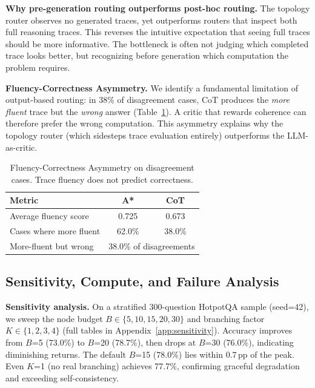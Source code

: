 \documentclass{article}
\begin{document}
\textbf{Why pre-generation routing outperforms post-hoc routing.}
The topology router observes no generated traces, yet outperforms routers that inspect both full reasoning traces. This reverses the intuitive expectation that seeing full traces should be more informative. The bottleneck is often not judging which completed trace looks better, but recognizing before generation which computation the problem requires.

\textbf{Fluency-Correctness Asymmetry.}
We identify a fundamental limitation of output-based routing: in 38\% of disagreement cases, CoT produces the \emph{more fluent} trace but the \emph{wrong} answer (Table~\ref{tab:fluency_asymmetry}). A critic that rewards coherence can therefore prefer the wrong computation. This asymmetry explains why the topology router (which sidesteps trace evaluation entirely) outperforms the LLM-as-critic.

\begin{table}[t]
\centering
\small
\begin{tabular}{lcc}
\toprule
\textbf{Metric} & \textbf{A*} & \textbf{CoT} \\
\midrule
Average fluency score & 0.725 & 0.673 \\
Cases where more fluent & 62.0\% & 38.0\% \\
More-fluent but wrong & \multicolumn{2}{c}{38.0\% of disagreements} \\
\bottomrule
\end{tabular}
\caption{Fluency-Correctness Asymmetry on disagreement cases. Trace fluency does not predict correctness.}
\label{tab:fluency_asymmetry}
\end{table}

\subsection{Sensitivity, Compute, and Failure Analysis}
\label{sec:sensitivity}

\textbf{Sensitivity analysis.}
On a stratified 300-question HotpotQA sample (seed=42), we sweep the node budget $B \in \{5,10,15,20,30\}$ and branching factor $K \in \{1,2,3,4\}$ (full tables in Appendix~\ref{app:sensitivity}). Accuracy improves from $B$=5 (73.0\%) to $B$=20 (78.7\%), then drops at $B$=30 (76.0\%), indicating diminishing returns. The default $B$=15 (78.0\%) lies within 0.7\,pp of the peak. Even $K$=1 (no real branching) achieves 77.7\%, confirming graceful degradation and exceeding self-consistency.
\end{document}
